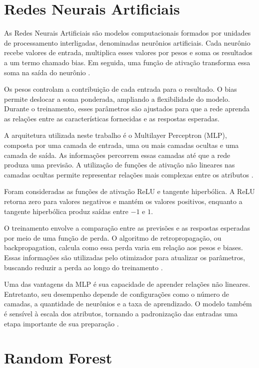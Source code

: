 \documentclass[12pt, oneside, a4paper, english, brazilian]{abntex2}
\begin{document}
\section{Redes Neurais Artificiais}

As Redes Neurais Artificiais são modelos computacionais formados por unidades de processamento interligadas, denominadas neurônios artificiais. Cada neurônio recebe valores de entrada, multiplica esses valores por pesos e soma os resultados a um termo chamado bias. Em seguida, uma função de ativação transforma essa soma na saída do neurônio \cite{haykin2009neural}.

Os pesos controlam a contribuição de cada entrada para o resultado. O bias permite deslocar a soma ponderada, ampliando a flexibilidade do modelo. Durante o treinamento, esses parâmetros são ajustados para que a rede aprenda as relações entre as características fornecidas e as respostas esperadas.

A arquitetura utilizada neste trabalho é o Multilayer Perceptron (MLP), composta por uma camada de entrada, uma ou mais camadas ocultas e uma camada de saída. As informações percorrem essas camadas até que a rede produza uma previsão. A utilização de funções de ativação não lineares nas camadas ocultas permite representar relações mais complexas entre os atributos \cite{haykin2009neural}.

Foram consideradas as funções de ativação ReLU e tangente hiperbólica. A ReLU retorna zero para valores negativos e mantém os valores positivos, enquanto a tangente hiperbólica produz saídas entre $-1$ e $1$.

O treinamento envolve a comparação entre as previsões e as respostas esperadas por meio de uma função de perda. O algoritmo de retropropagação, ou backpropagation, calcula como essa perda varia em relação aos pesos e biases. Essas informações são utilizadas pelo otimizador para atualizar os parâmetros, buscando reduzir a perda ao longo do treinamento \cite{haykin2009neural}.

Uma das vantagens da MLP é sua capacidade de aprender relações não lineares. Entretanto, seu desempenho depende de configurações como o número de camadas, a quantidade de neurônios e a taxa de aprendizado. O modelo também é sensível à escala dos atributos, tornando a padronização das entradas uma etapa importante de sua preparação \cite{pedregosa2011scikit}.

\section{Random Forest}
\end{document}

